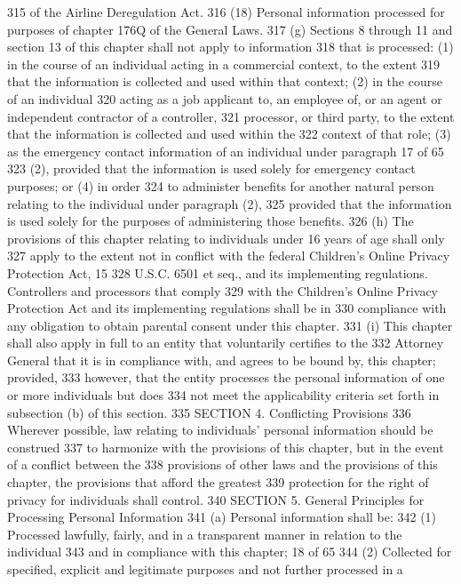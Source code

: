 315 of the Airline Deregulation Act.
316 (18) Personal information processed for purposes of chapter 176Q of the General Laws.
317 (g) Sections 8 through 11 and section 13 of this chapter shall not apply to information
318 that is processed: (1) in the course of an individual acting in a commercial context, to the extent
319 that the information is collected and used within that context; (2) in the course of an individual
320 acting as a job applicant to, an employee of, or an agent or independent contractor of a controller,
321 processor, or third party, to the extent that the information is collected and used within the
322 context of that role; (3) as the emergency contact information of an individual under paragraph
17 of 65
323 (2), provided that the information is used solely for emergency contact purposes; or (4) in order
324 to administer benefits for another natural person relating to the individual under paragraph (2),
325 provided that the information is used solely for the purposes of administering those benefits.
326 (h) The provisions of this chapter relating to individuals under 16 years of age shall only
327 apply to the extent not in conflict with the federal Children's Online Privacy Protection Act, 15
328 U.S.C. 6501 et seq., and its implementing regulations. Controllers and processors that comply
329 with the Children's Online Privacy Protection Act and its implementing regulations shall be in
330 compliance with any obligation to obtain parental consent under this chapter.
331 (i) This chapter shall also apply in full to an entity that voluntarily certifies to the
332 Attorney General that it is in compliance with, and agrees to be bound by, this chapter; provided,
333 however, that the entity processes the personal information of one or more individuals but does
334 not meet the applicability criteria set forth in subsection (b) of this section.
335 SECTION 4. Conflicting Provisions
336 Wherever possible, law relating to individuals’ personal information should be construed
337 to harmonize with the provisions of this chapter, but in the event of a conflict between the
338 provisions of other laws and the provisions of this chapter, the provisions that afford the greatest
339 protection for the right of privacy for individuals shall control.
340 SECTION 5. General Principles for Processing Personal Information
341 (a) Personal information shall be:
342 (1) Processed lawfully, fairly, and in a transparent manner in relation to the individual
343 and in compliance with this chapter;
18 of 65
344 (2) Collected for specified, explicit and legitimate purposes and not further processed in a
